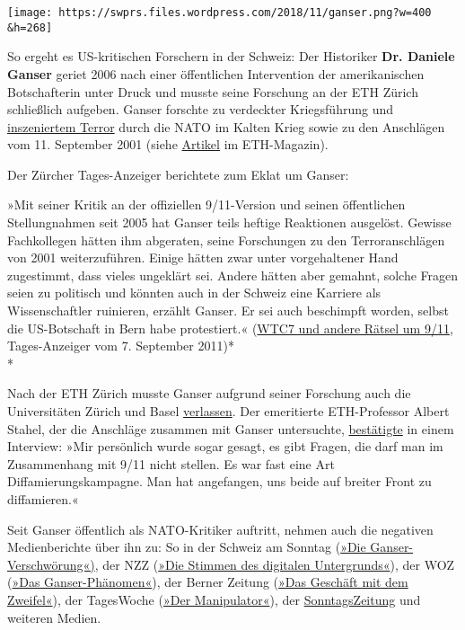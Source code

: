 \texttt{[image: https://swprs.files.wordpress.com/2018/11/ganser.png?w=400\\\&h=268]}

So ergeht es US-kritischen Forschern in der Schweiz: Der Historiker
\textbf{Dr. Daniele Ganser} geriet 2006 nach einer öffentlichen
Inter­vention der amerikanischen Botschafterin unter Druck und musste
seine Forschung an der ETH Zürich schließlich aufgeben. Ganser forschte
zu verdeckter Kriegs­führung und
\href{http://ofv.ch/sachbuch/detail/natogeheimarmeen-in-europa/3193/}{inszeniertem
Terror} durch die NATO im Kalten Krieg sowie zu den Anschlägen vom 11.
September 2001 (siehe
\href{http://archiv.ethlife.ethz.ch/articles/9.11.html}{Artikel} im
ETH-Magazin).

Der Zürcher Tages-Anzeiger berichtete zum Eklat um Ganser:

»Mit seiner Kritik an der offiziellen 9/11-Version und seinen
öffentlichen Stellungnahmen seit 2005 hat Ganser teils heftige
Reaktionen ausgelöst. Gewisse Fachkollegen hätten ihm abgeraten, seine
Forschungen zu den Terror­anschlägen von 2001 weiter­zu­führen. Einige
hätten zwar unter vorge­haltener Hand zugestimmt, dass vieles ungeklärt
sei. Andere hätten aber gemahnt, solche Fragen seien zu politisch und
könnten auch in der Schweiz eine Karriere als Wissenschaftler ruinieren,
erzählt Ganser. Er sei auch beschimpft worden, selbst die US-Botschaft
in Bern habe protestiert.«
(\href{http://www.tagesanzeiger.ch/ausland/amerika/WTC7-und-andere-Raetsel-um-911/story/26888372?dossier_id=544}{WTC7
und andere Rätsel um 9/11}, Tages-Anzeiger vom 7. September 2011)*\\
*

Nach der ETH Zürich musste Ganser aufgrund seiner Forschung auch die
Universitäten Zürich und Basel
\href{https://www.aargauerzeitung.ch/schweiz/daniele-ganser-star-der-verschwoerungsszene-verstossenes-kind-der-wissenschaft-132406642}{verlassen}.
Der emeritierte ETH-Professor Albert Stahel, der die Anschläge zusammen
mit Ganser untersuchte,
\href{http://www.srf.ch/play/tv/einstein/video/die-anatomie-von-verschwoerungstheorien?id=94905414-61a4-40fe-ba8c-1c8048ed7a76\&startTime=778}{bestätigte}
in einem Interview: »Mir persönlich wurde sogar gesagt, es gibt Fragen,
die darf man im Zusammenhang mit 9/11 nicht stellen. Es war fast eine
Art Diffamierungskampagne. Man hat angefangen, uns beide auf breiter
Front zu diffamieren.«

Seit Ganser öffentlich als NATO-Kritiker auftritt, nehmen auch die
negativen Medienberichte über ihn zu: So in der Schweiz am Sonntag
(\href{http://www.schweizamsonntag.ch/ressort/basel/die_ganser-verschwoerung/}{»Die
Ganser-Verschwörung«)}, der NZZ
(\href{https://www.nzz.ch/feuilleton/medien/die-stimmen-des-digitalen-untergrunds-1.18627359}{»Die
Stimmen des digitalen Untergrunds«}), der WOZ
(\href{https://www.woz.ch/-768a}{»Das Ganser-Phänomen«}), der Berner
Zeitung
(\href{https://www.bernerzeitung.ch/schweiz/standard/das-geschaeft-mit-dem-zweifel/story/11814825}{»Das
Geschäft mit dem Zweifel«}), der TagesWoche
(\href{https://tageswoche.ch/gesellschaft/der-manipulator/}{»Der
Manipulator«}), der
\href{https://www.tagesanzeiger.ch/sonntagszeitung/wenn-alles-mit-allem-zu-tun-hat/story/23220523}{SonntagsZeitung}
und weiteren Medien.

